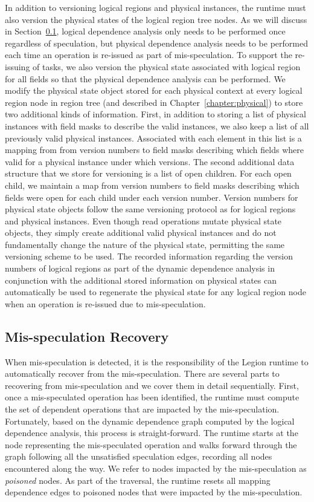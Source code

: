 In addition to versioning logical regions and physical
instances, the runtime must also version the physical
states of the logical region tree nodes. As we will
discuss in Section~\ref{subsec:recovery}, logical
dependence analysis only needs to be performed once
regardless of speculation, but physical dependence 
analysis needs to be performed each time an operation
is re-issued as part of mis-speculation. To support the
re-issuing of tasks, we also version the physical state
associated with logical region for all fields so that
the physical dependence analysis can be performed.
We modify the physical state object stored for each
physical context at every logical region node in region
tree (and described in Chapter~\ref{chapter:physical}) to 
store two additional kinds of information. First, in addition
to storing a list of physical instances with field masks to 
describe the valid instances, we also keep a list of all 
previously valid physical instances. Associated with each
element in this list is a mapping from from version numbers
to field masks describing which fields where valid for a
physical instance under which versions. The second 
additional data structure that we store for versioning is
a list of open children. For each open child, we maintain
a map from version numbers to field masks describing 
which fields were open for each child under each version
number. Version numbers for physical state objects follow
the same versioning protocol as for logical regions and
physical instances. Even though read operations mutate
physical state objects, they simply create additional 
valid physical instances and do not fundamentally change
the nature of the physical state, permitting the same
versioning scheme to be used. The recorded information 
regarding the version numbers of logical regions as
part of the dynamic dependence analysis in conjunction
with the additional stored information on physical states
can automatically be used to regenerate the physical
state for any logical region node when an operation
is re-issued due to mis-speculation.

\subsection{Mis-speculation Recovery}
\label{subsec:recovery}
When mis-speculation is detected, it is the responsibility
of the Legion runtime to automatically recover from the 
mis-speculation. There are several parts to recovering from
mis-speculation and we cover them in detail sequentially.
First, once a mis-speculated operation has been identified,
the runtime must compute the set of dependent operations 
that are impacted by the mis-speculation. Fortunately, based
on the dynamic dependence graph computed by the logical
dependence analysis, this process is straight-forward. The
runtime starts at the node representing the mis-speculated
operation and walks forward through the graph following all
the unsatisfied speculation edges, recording all nodes
encountered along the way. We refer to nodes impacted by
the mis-speculation as {\em poisoned} nodes. As part of 
the traversal, the runtime resets all mapping dependence
edges to poisoned nodes that were impacted by the 
mis-speculation. 

